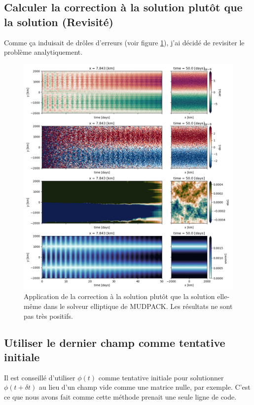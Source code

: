 \documentclass[10pt]{article}
\numberwithin{equation}{section}
\begin{document}
\subsection{Calculer la correction à la solution plutôt que la solution (Revisité)}
\label{sec:org2e168f9}

Comme ça induisait de drôles d'erreurs (voir figure \ref{fig:org834de09}), j'ai décidé de revisiter le problème analytiquement.

\begin{figure}[htbp]
\centering
\includegraphics[width=.9\linewidth]{figures/tests/2023-05-23_hovmoller1.png}
\caption{\label{fig:org834de09}Application de la correction à la solution plutôt que la solution elle-même dans le solveur elliptique de MUDPACK. Les résultats ne sont pas très positifs.}
\end{figure}

\subsection{Utiliser le dernier champ comme tentative initiale}
\label{sec:org16900e2}
Il est conseillé d'utiliser \(\phi(t)\) comme tentative initiale pour solutionner \(\phi(t+\delta t)\) au lieu d'un champ vide comme une matrice nulle, par exemple.
C'est ce que nous avons fait comme cette méthode prenait une seule ligne de code. 
\end{document}
